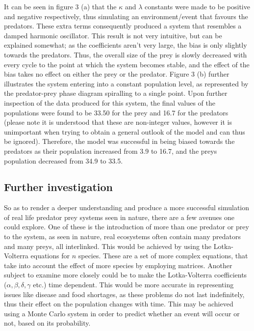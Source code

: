 \documentclass[11pt]{elsarticle}
\begin{document}
It can be seen in figure 3 (a) that the $\kappa$ and $\lambda$ constants were made to be positive and negative respectively, thus simulating an environment/event that favours the predators. These extra terms consequently produced a system that resembles a damped harmonic oscillator. This result is not very intuitive, but can be explained somewhat; as the coefficients aren't very large, the bias is only slightly towards the predators. Thus, the overall size of the prey is slowly decreased with every cycle to the point at which the system becomes stable, and the effect of the bias takes no effect on either the prey or the predator. Figure 3 (b) further illustrates the system entering into a constant population level, as represented by the predator-prey phase diagram spiralling to a single point. Upon further inspection of the data produced for this system, the final values of the populations were found to be 33.50 for the prey and 16.7 for the predators (please note it is understood that these are non-integer values, however it is unimportant when trying to obtain a general outlook of the model and can thus be ignored). Therefore, the model was successful in being biased towards the predators as their population increased from 3.9 to 16.7, and the preys population decreased from 34.9 to 33.5.
\newpage
\subsection*{\textbf{Further investigation}}
So as to render a deeper understanding and produce a more successful simulation of real life predator prey systems seen in nature, there are a few avenues one could explore. One of these is the introduction of more than one predator or prey to the system, as seen in nature, real ecosystems often contain many predators and many preys, all interlinked. This would be achieved by  using the Lotka-Volterra equations for $n$ species. These are a set of more complex equations, that take into account the effect of more species by employing matrices. Another subject to examine more closely could be to make the Lotka-Volterra coefficients ($\alpha,\beta,\delta,\gamma$ etc.) time dependent. This would be more accurate in representing issues like disease and food shortages, as these problems do not last indefinitely, thus their effect on the population changes with time. This may be achieved using a Monte Carlo system in order to predict whether an event will occur or not, based on its probability.
\end{document}
